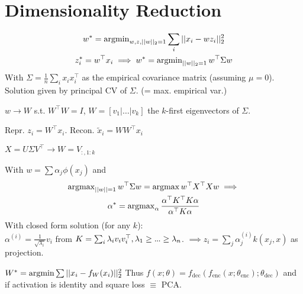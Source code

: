 \section{Dimensionality Reduction} \vspace{-11pt}
\begin{gather*}
  w^* = \operatorname{argmin}_{w, z, ||w||_2 = 1} \sum_i ||x_i - w z_i||_2^2 \\
  z_i^* = w^\top x_i \implies w^* = \operatorname{argmin}_{||w||_2 = 1} w^\top \Sigma w
\end{gather*}
With \(\Sigma = \frac{1}{n} \sum_i x_i x_i^\top\) as the empirical covariance matrix (assuming \(\mu = 0\)). Solution given by principal CV of \(\Sigma\). (= max. empirical var.)

\begin{definition}
  \(w \to W\) s.t. \(W^\top W = I\), \(W = [v_1 | \ldots | v_k]\) the \(k\)-first eigenvectors of \(\Sigma\).

  Repr. \(z_i = W^\top x_i\). Recon. \(\tilde{x}_i = W W^\top x_i\)
\end{definition}

\begin{definition}
  \(X = U \Sigma V^\top \to W = V_{:, 1:k}\)
\end{definition}

\begin{definition}
  With \(w = \sum \alpha_j \phi(x_j)\) and
  \begin{gather*}
    \operatorname{argmax}_{||w|| = 1} w^\top \Sigma w = \operatorname{argmax} w^\top X^\top X w \implies \\
    \alpha^* = \operatorname{argmax}_\alpha \frac{\alpha^\top K^\top K \alpha}{\alpha^\top K \alpha}
  \end{gather*} 
  With closed form solution (for any \(k\)): \\
  \(\alpha^{(i)} = \frac{1}{\sqrt{\lambda_i}} v_i\) from \(K = \sum_i \lambda_i v_i v_i^\top, \lambda_1 \geq \sdots \geq \lambda_n\).
  \(\implies z_i = \sum_j \alpha_j^{(i)} k(x_j, x)\) as projection.
\end{definition}

\begin{definition}[Autoencoder]
  \(W^* = \operatorname{argmin} \sum ||x_i - f_W(x_i)||_2^2\)
  Thus \(f(x; \theta) = f_{\text{dec}}(f_{\text{enc}}(x ; \theta_{\text{enc}}); \theta_{\text{dec}})\) and if activation is identity and square loss \(\equiv\) PCA.
\end{definition}